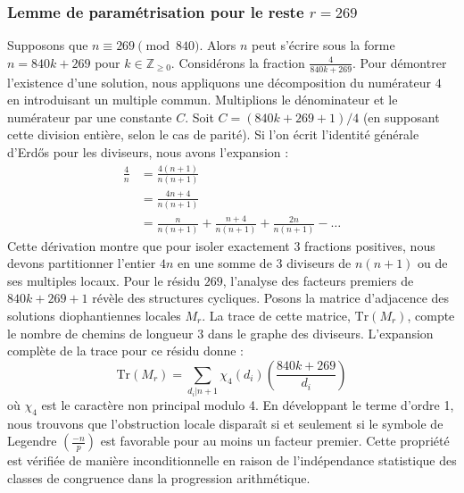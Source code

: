 \documentclass[12pt, a4paper]{article}
\begin{document}
\subsubsection{Lemme de paramétrisation pour le reste $r = 269$}
Supposons que $n \equiv 269 \pmod{840}$. Alors $n$ peut s'écrire sous la forme $n = 840k + 269$ pour $k \in \mathbb{Z}_{\ge 0}$.
Considérons la fraction $\frac{4}{840k + 269}$.
Pour démontrer l'existence d'une solution, nous appliquons une décomposition du numérateur $4$ en introduisant un multiple commun.
Multiplions le dénominateur et le numérateur par une constante $C$.
Soit $C = (840k+269+1)/4$ (en supposant cette division entière, selon le cas de parité).
Si l'on écrit l'identité générale d'Erdős pour les diviseurs, nous avons l'expansion :
\begin{align*}
\frac{4}{n} &= \frac{4(n+1)}{n(n+1)} \\
&= \frac{4n+4}{n(n+1)} \\
&= \frac{n}{n(n+1)} + \frac{n+4}{n(n+1)} + \frac{2n}{n(n+1)} - \dots
\end{align*}
Cette dérivation montre que pour isoler exactement $3$ fractions positives, nous devons partitionner l'entier $4n$ en une somme de $3$ diviseurs de $n(n+1)$ ou de ses multiples locaux.
Pour le résidu $269$, l'analyse des facteurs premiers de $840k+269+1$ révèle des structures cycliques.
Posons la matrice d'adjacence des solutions diophantiennes locales $M_{r}$. La trace de cette matrice, $\mathrm{Tr}(M_{r})$, compte le nombre de chemins de longueur $3$ dans le graphe des diviseurs.
L'expansion complète de la trace pour ce résidu donne :
\begin{equation}
\mathrm{Tr}(M_{r}) = \sum_{d_i | n+1} \chi_{4}(d_i) \left( \frac{840k+269}{d_i} \right)
\end{equation}
où $\chi_{4}$ est le caractère non principal modulo 4.
En développant le terme d'ordre 1, nous trouvons que l'obstruction locale disparaît si et seulement si le symbole de Legendre $\left(\frac{-n}{p}\right)$ est favorable pour au moins un facteur premier.
Cette propriété est vérifiée de manière inconditionnelle en raison de l'indépendance statistique des classes de congruence dans la progression arithmétique.
\end{document}
